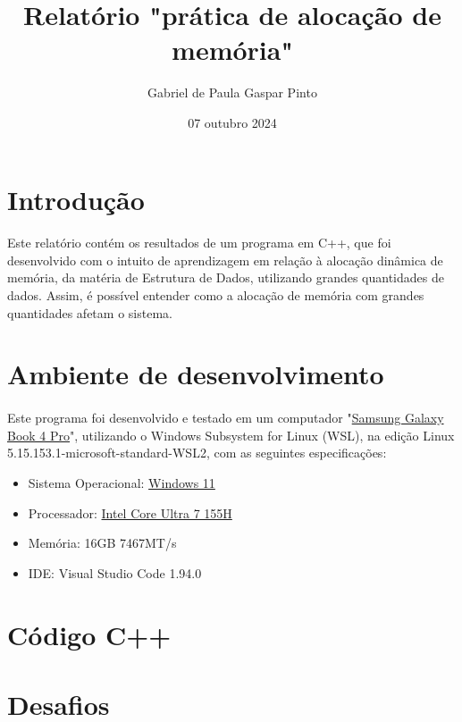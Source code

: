 \documentclass{article}
\title{Relatório "prática de alocação de memória"}
\author{Gabriel de Paula Gaspar Pinto}
\date{07 outubro 2024}
\begin{document}
\maketitle

\section{Introdução}
\paragraph{}Este relatório contém os resultados de um programa em C++, que foi desenvolvido com o intuito de aprendizagem em relação à alocação dinâmica de memória, da matéria de Estrutura de Dados, utilizando grandes quantidades de dados. Assim, é possível entender como a alocação de memória com grandes quantidades afetam o sistema.

\section{Ambiente de desenvolvimento}
\paragraph{} Este programa foi desenvolvido e testado em um computador "\href{https://www.samsung.com/br/computers/samsung-book/galaxy-book4-pro-14-inch-ultra-7-16gb-512gb-np940xgk-kg1br/#specs}{Samsung Galaxy Book 4 Pro}", utilizando o Windows Subsystem for Linux (WSL), na edição Linux 5.15.153.1-microsoft-standard-WSL2, com as seguintes especificações:
\begin{itemize}
    \item Sistema Operacional: \href{https://www.microsoft.com/pt-br/windows}{Windows 11}
    \item Processador: \href{https://www.intel.com.br/content/www/br/pt/products/sku/236847/intel-core-ultra-7-processor-155h-24m-cache-up-to-4-80-ghz/specifications.html}{ Intel Core Ultra 7 155H}
    \item Memória: 16GB 7467MT/s
    \item IDE: Visual Studio Code 1.94.0
\end{itemize}

\section{Código C++}


\section{Desafios}
\end{document}
